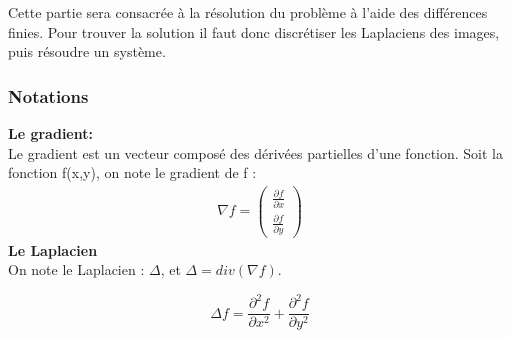 Cette partie sera consacrée à la résolution du problème à l'aide des différences finies. Pour trouver la solution il faut donc discrétiser les Laplaciens des images, puis résoudre un système.
 \subsubsection{Notations}
\textbf{Le gradient: }\\
Le gradient est un vecteur composé des dérivées partielles d'une fonction. Soit la fonction f(x,y), on note le gradient de f : 
\begin{equation*}
\begin{aligned}
\nabla f = \begin{pmatrix}
\frac{\partial f}{\partial x}\\
\frac{\partial f}{\partial y}
\end{pmatrix}
\end{aligned}
\end{equation*}
\textbf{Le Laplacien}\\
On note le Laplacien : $\Delta$, et $\Delta = div(\nabla f)$.
\begin{center}
\begin{equation*}
    \Delta f  = \frac{\partial^2 f}{\partial x^2}+ \frac{\partial ^2 f}{\partial y^2}
\end{equation*}
\end{center}

